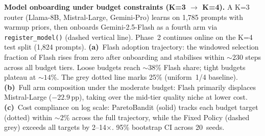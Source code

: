 
\textbf{Model onboarding under budget constraints (K=3 $\to$ K=4).}
A K=3 router (Llama-8B, Mistral-Large, Gemini-Pro) learns on 1{,}785
prompts with warmup priors, then onboards Gemini-2.5-Flash as a fourth arm
via \texttt{register\_model()} (dashed vertical line).
Phase~2 continues online on the K=4 test split (1{,}824 prompts).
\textbf{(a)}~Flash adoption trajectory: the windowed selection fraction
of Flash rises from zero after onboarding and stabilises within
${\sim}230$ steps across all budget tiers. Loose budgets reach
${\sim}38$\% Flash share; tight budgets plateau at ${\sim}14$\%.
The grey dotted line marks 25\% (uniform~1/4 baseline).
\textbf{(b)}~Full arm composition under the moderate budget: Flash
primarily displaces Mistral-Large ($-22.9$\,pp), taking over the
mid-tier quality niche at lower cost.
\textbf{(c)}~Cost compliance on log scale: ParetoBandit (solid) tracks
each budget target (dotted) within ${\sim}2$\% across the full
trajectory, while the Fixed Policy (dashed grey) exceeds all targets
by 2--14$\times$.
95\% bootstrap CI across 20~seeds.
